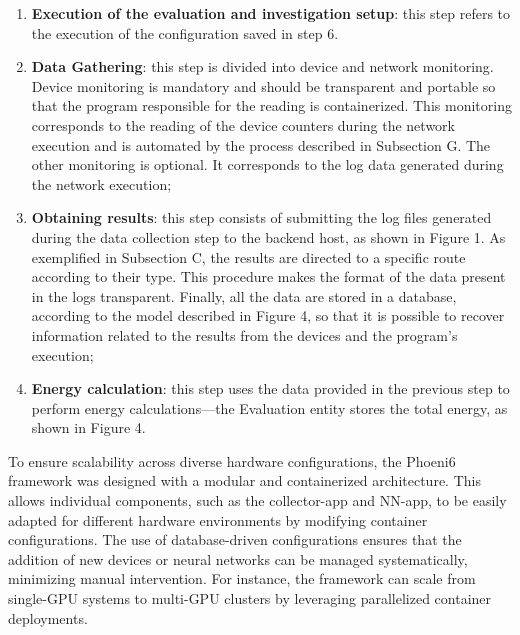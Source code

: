 \begin{enumerate}
    \item \textbf{Execution of the evaluation and investigation setup}: this step refers to the execution of the configuration saved in step 6.
    
    \item \textbf{Data Gathering}: this step is divided into device and network monitoring. Device monitoring is mandatory and should be transparent and portable so that the program responsible for the reading is containerized. This monitoring corresponds to the reading of the device counters during the network execution and is automated by the process described in Subsection G. The other monitoring is optional. It corresponds to the log data generated during the network execution;
        
    \item \textbf{Obtaining results}: this step consists of submitting the log files generated during the data collection step to the backend host, as shown in Figure 1. As exemplified in Subsection C, the results are directed to a specific route according to their type. This procedure makes the format of the data present in the logs transparent. Finally, all the data are stored in a database, according to the model described in Figure 4, so that it is possible to recover information related to the results from the devices and the program's execution;

    \item \textbf{Energy calculation}: 
        this step uses the data provided in the previous step to perform energy calculations—the Evaluation entity stores the total energy, as shown in Figure 4.    

\end{enumerate}

To ensure scalability across diverse hardware configurations, the Phoeni6 framework was designed with a modular and containerized architecture. This allows individual components, such as the collector-app and NN-app, to be easily adapted for different hardware environments by modifying container configurations. The use of database-driven configurations ensures that the addition of new devices or neural networks can be managed systematically, minimizing manual intervention. For instance, the framework can scale from single-GPU systems to multi-GPU clusters by leveraging parallelized container deployments.